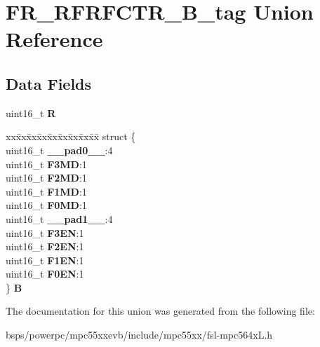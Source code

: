 \hypertarget{unionFR__RFRFCTR__16B__tag}{}\section{F\+R\+\_\+\+R\+F\+R\+F\+C\+T\+R\+\_\+B\+\_\+tag Union Reference}
\label{unionFR__RFRFCTR__16B__tag}
\subsection*{Data Fields}
\begin{DoxyCompactItemize}
\item 
\mbox{\label{unionFR__RFRFCTR__16B__tag_abba7efc61da997a25efdfa534c7d2da9}} 
uint16\+\_\+t {\bfseries R}
\item 
\mbox{\label{unionFR__RFRFCTR__16B__tag_a977331b416db9016a8d9414385e1e8ef}} 
\begin{tabbing}
xx\=xx\=xx\=xx\=xx\=xx\=xx\=xx\=xx\=\kill
struct \{\\
\>uint16\_t {\bfseries \_\_pad0\_\_}:4\\
\>uint16\_t {\bfseries F3MD}:1\\
\>uint16\_t {\bfseries F2MD}:1\\
\>uint16\_t {\bfseries F1MD}:1\\
\>uint16\_t {\bfseries F0MD}:1\\
\>uint16\_t {\bfseries \_\_pad1\_\_}:4\\
\>uint16\_t {\bfseries F3EN}:1\\
\>uint16\_t {\bfseries F2EN}:1\\
\>uint16\_t {\bfseries F1EN}:1\\
\>uint16\_t {\bfseries F0EN}:1\\
\} {\bfseries B}\\

\end{tabbing}\end{DoxyCompactItemize}


The documentation for this union was generated from the following file\+:\begin{DoxyCompactItemize}
\item 
bsps/powerpc/mpc55xxevb/include/mpc55xx/fsl-\/mpc564x\+L.\+h\end{DoxyCompactItemize}
